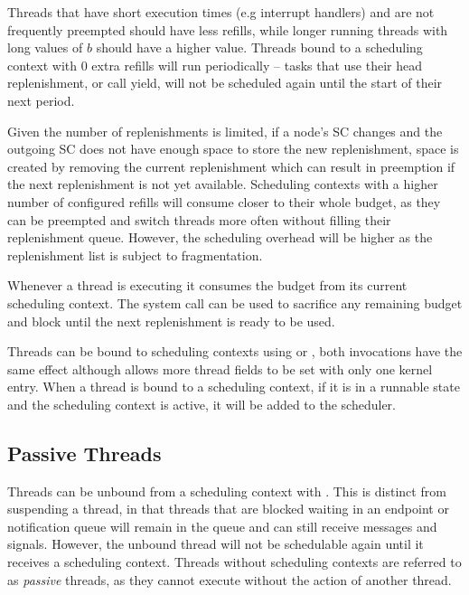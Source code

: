 Threads that have short execution times (e.g interrupt handlers) and are not frequently preempted
should have less refills, while longer running threads with long values of $b$ should have a higher
value. Threads bound to a scheduling context with 0 extra refills will run periodically -- tasks
that use their head replenishment, or call yield, will not be scheduled again until the start of
their next period.

Given the number of replenishments is limited, if a node's SC changes and the outgoing SC does not
have enough space to store the new replenishment, space is created by removing the current
replenishment which can result in preemption if the next replenishment is not yet available.
Scheduling contexts with a higher number of configured refills will consume closer
to their whole budget, as they can be preempted and switch threads more often without filling their
replenishment queue. However, the scheduling overhead will be higher as the replenishment list is
subject to fragmentation.

Whenever a thread is executing it consumes the budget from its current scheduling context.  The
system call  can be used to sacrifice any remaining budget and
block until the next replenishment is ready to be used.

Threads can be bound to scheduling contexts using  or
, both invocations have the same effect
although  allows more thread fields to be set with only
one kernel entry.  When a thread is bound to a scheduling context, if it is in a runnable state and
the scheduling context is active, it will be added to the scheduler.

\subsection{Passive Threads} \label{sec:passive}

Threads can be unbound from a scheduling context with
.  This is distinct from
suspending a thread, in that threads that are blocked waiting in an endpoint or notification queue
will remain in the queue and can still receive messages and signals.  However, the unbound thread
will not be schedul\-able again until it receives a scheduling context.  Threads without scheduling
contexts are referred to as \emph{passive} threads, as they cannot execute without the action of
another thread.

